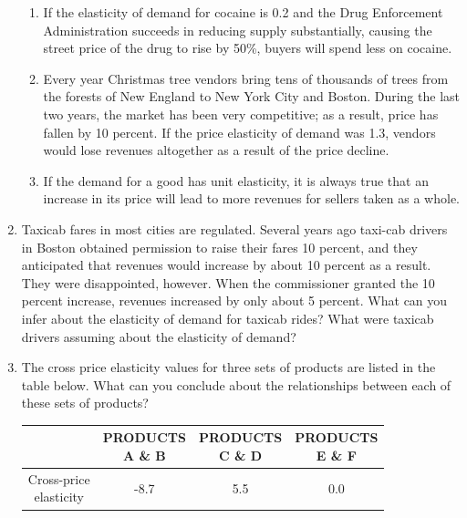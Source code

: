 \documentclass{article}
\begin{document}
\begin{enumerate}
\begin{enumerate}
	\item If the elasticity of demand for cocaine is 0.2 and the Drug Enforcement Administration succeeds in reducing supply substantially, causing the street price of the drug to rise by 50\%, buyers will spend less on cocaine.
	
	\item Every year Christmas tree vendors bring tens of thousands of trees from the forests of New England to New York City and Boston. During the last two years, the market has been very competitive; as a result, price has fallen by 10 percent. If the price elasticity of demand was 1.3, vendors would lose revenues altogether as a result of the price decline.
	
	\item If the demand for a good has unit elasticity, it is always true that an increase in its price will lead to more revenues for sellers taken as a whole.
	
	\end{enumerate}

\item Taxicab fares in most cities are regulated. Several years ago taxi-cab drivers in Boston obtained permission to raise their fares 10 percent, and they anticipated that revenues would increase by about 10 percent as a result. They were disappointed, however. When the commissioner granted the 10 percent increase, revenues increased by only about 5 percent. What can you infer about the elasticity of demand for taxicab rides? What were taxicab drivers assuming about the elasticity of demand?

\item The cross price elasticity values for three sets of products are listed in the table below. What can you conclude about the relationships between each of these sets of products?

\begin{tabular}{| c | c | c | c |}
\hline
& \makecell{PRODUCTS\\A \& B} & \makecell{PRODUCTS\\C \& D} & \makecell{PRODUCTS\\E \& F} \\
\hline
\makecell{Cross-price\\elasticity} & -8.7 & 5.5 & 0.0 \\
\hline
\end{tabular}

\end{enumerate}
\end{document}
